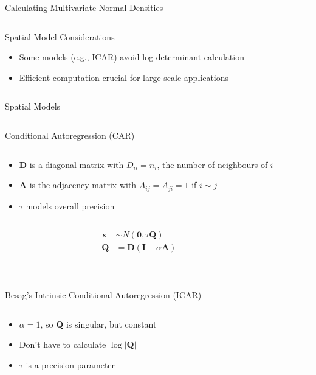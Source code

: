 \documentclass[
  ignorenonframetext,
]{beamer}
\providecommand{\tightlist}{%
  \setlength{\itemsep}{0pt}\setlength{\parskip}{0pt}}\usepackage{longtable,booktabs,array}
\begin{document}
\begin{frame}{Calculating Multivariate Normal Densities}
\begin{columns}[T]
\begin{column}{0.5\textwidth}
\begin{block}{Spatial Model Considerations}
\label{spatial-model-considerations}
\begin{itemize}
\tightlist
\item
  Some models (e.g., ICAR) avoid log determinant calculation
\item
  Efficient computation crucial for large-scale applications
\end{itemize}
\end{block}
\end{column}
\end{columns}
\end{frame}

\begin{frame}{Spatial Models}
\label{spatial-models}
\begin{columns}[T]
\begin{block}{Conditional Autoregression (CAR)}
\label{conditional-autoregression-car}
\begin{column}{0.5\textwidth}
\begin{itemize}
\tightlist
\item
  \(\mathbf{D}\) is a diagonal matrix with \(D_{ii} = n_i\), the number
  of neighbours of \(i\)
\item
  \(\mathbf{A}\) is the adjacency matrix with \(A_{ij} = A_{ji} = 1\) if
  \(i \sim j\)
\item
  \(\tau\) models overall precision
\end{itemize}
\end{column}

\begin{column}{0.5\textwidth}
\[
\begin{aligned}
\mathbf{x} &\sim N(\mathbf{0}, \tau \mathbf{Q}) \\
\mathbf{Q} &= \mathbf{D}\left(\mathbf{I} - \alpha \mathbf{A} \right)
\end{aligned}
\]
\end{column}
\end{block}
\end{columns}

\begin{center}\rule{0.5\linewidth}{0.5pt}\end{center}

\begin{columns}[T]
\begin{block}{Besag's Intrinsic Conditional Autoregression (ICAR)}
\label{besags-intrinsic-conditional-autoregression-icar}
\begin{column}{0.5\textwidth}
\begin{itemize}
\tightlist
\item
  \(\alpha = 1\), so \(\mathbf Q\) is singular, but constant
\item
  Don't have to calculate \(\log |\mathbf{Q}|\)
\item
  \(\tau\) is a precision parameter
\end{itemize}
\end{column}


\end{block}
\end{columns}
\end{frame}
\end{document}
